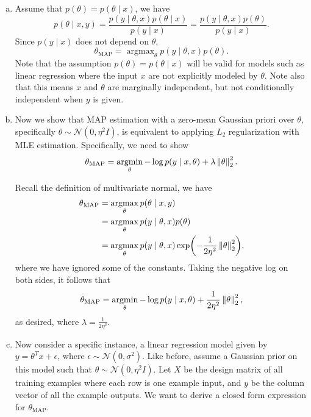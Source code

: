 \documentclass[12pt,letterpaper,boxed]{hmcpset}
\DeclareMathOperator*{\argmax}{argmax}
\DeclareMathOperator*{\argmin}{argmin}
\begin{document}
\begin{solution}
  \begin{enumerate}[(a)]
    \item Assume that $p(\theta) = p(\theta \mid x)$, we have
    \[
    p(\theta \mid x,y) = \frac{p(y \mid \theta, x)p(\theta \mid x)}{p(y \mid x)} = \frac{p(y \mid \theta, x) p(\theta)}{p(y \mid x)}.
    \]
    Since $p(y \mid x)$ does not depend on $\theta$, 
    \[
    \theta_{\mathrm{MAP}} = \argmax_\theta p(y \mid \theta, x) p(\theta).
    \]
    Note that the assumption $p(\theta) = p(\theta \mid x)$ will be valid for models such as linear regression where the input $x$ are not explicitly modeled by $\theta$. Note also that this means $x$ and $\theta$ are marginally independent, but not conditionally independent when $y$ is given.

    \item Now we show that MAP estimation with a zero-mean Gaussian priori over $\theta$, specifically $\theta \sim \mathcal{N}(0, \eta^2 I)$, is equivalent to applying $L_2$ regularization with MLE estimation. Specifically, we need to show
    \[
    \theta_{\mathrm{MAP}} = \argmin_{\theta} -\log p(y \mid x, \theta) + \lambda \norm{\theta}_2^2.
    \]

    Recall the definition of multivariate normal, we have
    \[
    \begin{aligned}  
      \theta_{\mathrm{MAP}} &= \argmax_\theta p(\theta \mid x,y) \\
      &= \argmax_\theta p(y \mid \theta,x) p(\theta) \\
      &= \argmax_\theta p(y \mid \theta,x) \exp(-\frac{1}{2\eta^2} \norm{\theta}_2^2),
    \end{aligned}
    \]
    where we have ignored some of the constants. Taking the negative log on both sides, it follows that
    \[
    \theta_{\mathrm{MAP}} = \argmin_\theta -\log p(y \mid x, \theta) + \frac{1}{2\eta^2} \norm{\theta}_2^2,
    \]
    as desired, where $\lambda = \frac{1}{2\eta^2}$.

    \item Now consider a specific instance, a linear regression model given by $y = \theta^T x + \epsilon$, where $\epsilon \sim \mathcal{N}(0, \sigma^2)$. Like before, assume a Gaussian prior on this model such that $\theta \sim \mathcal{N}(0,\eta^2 I).$ Let $X$ be the design matrix of all training examples where each row is one example input, and $y$ be the column vector of all the example outputs. We want to derive a closed form expression for $\theta_{\mathrm{MAP}}$.
    

\end{enumerate}
\end{solution}
\end{document}
